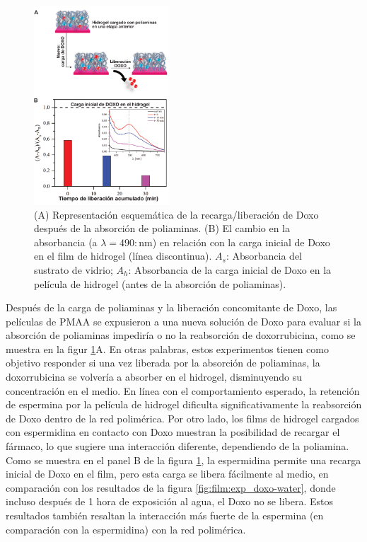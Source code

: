 \begin{figure}[!htb]
	\centering
	\includegraphics[width=0.45\textwidth]{Figures/graph-film/fig12.pdf}
	\caption{(A) Representaci\'on esquem\'atica de la recarga/liberaci\'on de Doxo despu\'es de la absorci\'on de poliaminas. (B) El cambio en la absorbancia (a $\lambda=490:$nm) en relaci\'on con la carga inicial de Doxo en el film de hidrogel (l\'inea discontinua). $A_s$: Absorbancia del sustrato de vidrio; $A_h$: Absorbancia de la carga inicial de Doxo en la pel\'icula de hidrogel (antes de la absorci\'on de poliaminas).}
	\label{fig:film:exp_doxo-reload}
\end{figure}


Despu\'es de la carga de poliaminas y la liberaci\'on concomitante de Doxo, las pel\'iculas de PMAA se expusieron a una nueva soluci\'on de Doxo para evaluar si la absorci\'on de poliaminas impedir\'ia o no la reabsorci\'on de doxorrubicina, como se muestra en la figur \ref{fig:film:exp_doxo-reload}A. En otras palabras, estos experimentos tienen como objetivo responder si una vez liberada por la absorci\'on de poliaminas, la doxorrubicina se volver\'ia a absorber en el hidrogel, disminuyendo su concentraci\'on en el medio. En l\'inea con el comportamiento esperado, la retenci\'on de espermina por la pel\'icula de hidrogel dificulta significativamente la reabsorci\'on de Doxo dentro de la red polim\'erica.%
Por otro lado, los films de hidrogel cargados con espermidina en contacto con Doxo muestran la posibilidad de recargar el f\'armaco, lo que sugiere una interacci\'on diferente, dependiendo de la poliamina. Como se muestra en el panel B de la figura \ref{fig:film:exp_doxo-reload}, la espermidina permite una recarga inicial de Doxo en el film, pero esta carga se libera f\'acilmente al medio, en comparaci\'on con los resultados de la figura \ref{fig:film:exp_doxo-water}, donde incluso despu\'es de 1 hora de exposici\'on al agua, el Doxo no se libera. Estos resultados tambi\'en resaltan la interacci\'on m\'as fuerte de la espermina (en comparaci\'on con la espermidina) con la red polim\'erica.

